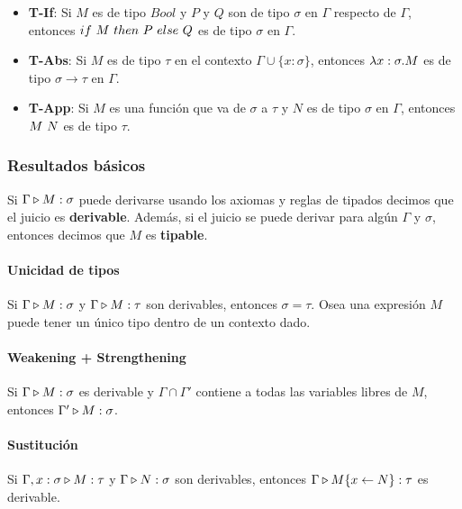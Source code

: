 \vspace*{5mm}
\begin{itemize}
	\item \textbf{T-If}: Si $M$ es de tipo $Bool$ y $P$ y $Q$ son de tipo $\sigma$ en $\Gamma$ respecto de $\Gamma$, entonces $if~ M~ then~ P~ else~ Q$ es de tipo $\sigma$ en $\Gamma$.
	\item \textbf{T-Abs}: Si $M$ es de tipo $\tau$ en el contexto $\Gamma\cup \{x:\sigma\}$, entonces $\lambda x: \sigma . M$ es de tipo $\sigma\to\tau$ en $\Gamma$.
	\item \textbf{T-App}: Si $M$ es una función que va de $\sigma$ a $\tau$ y $N$ es de tipo $\sigma$ en $\Gamma$, entonces $M~N$ es de tipo $\tau$.
	
\end{itemize}

\subsubsection{Resultados básicos}

Si $\Gamma\triangleright M : \sigma$ puede derivarse usando los axiomas y reglas de tipados decimos que el juicio es \textbf{derivable}. Además, si el juicio se puede derivar para algún $\Gamma$ y $\sigma$, entonces decimos que $M$ es \textbf{tipable}.

\paragraph{Unicidad de tipos} Si $\Gamma\triangleright M : \sigma$ y $\Gamma\triangleright M : \tau$ son derivables, entonces $\sigma = \tau$. Osea una expresión $M$ puede tener un único tipo dentro de un contexto dado.

\paragraph{Weakening + Strengthening} Si $\Gamma\triangleright M : \sigma$ es derivable y $\Gamma\cap\Gamma'$ contiene a todas las variables libres de $M$, entonces $\Gamma'\triangleright M : \sigma$.

\paragraph{Sustitución} Si $\Gamma,x:\sigma\triangleright M : \tau$ y $\Gamma\triangleright N : \sigma$ son derivables, entonces $\Gamma\triangleright M\{x\leftarrow N\} : \tau$ es derivable.

